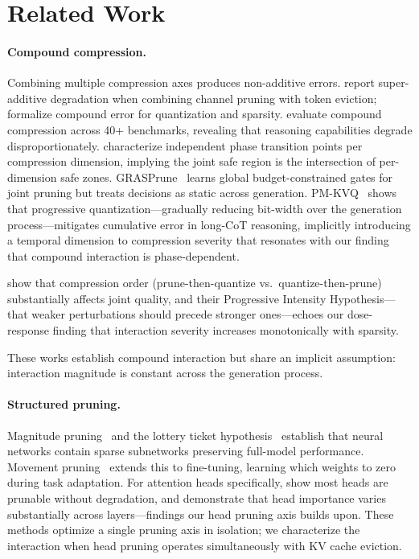 \section{Related Work}
\label{sec:related}

\paragraph{Compound compression.}
Combining multiple compression axes produces non-additive errors.
\cite{spark-aaai2026} report super-additive degradation when combining channel pruning with token eviction; \cite{slim-icml2025} formalize compound error for quantization and sparsity.
\cite{unicomp-2026} evaluate compound compression across 40+ benchmarks, revealing that reasoning capabilities degrade disproportionately.
\cite{phase-transition-compression-2026} characterize independent phase transition points per compression dimension, implying the joint safe region is the intersection of per-dimension safe zones.
GRASPrune~\cite{graspune-acl2026} learns global budget-constrained gates for joint pruning but treats decisions as static across generation.
PM-KVQ~\cite{pmkvq-iclr2026} shows that progressive quantization---gradually reducing bit-width over the generation process---mitigates cumulative error in long-CoT reasoning, implicitly introducing a temporal dimension to compression severity that resonates with our finding that compound interaction is phase-dependent.

\cite{kim2026pqqp} show that compression order (prune-then-quantize vs.\ quantize-then-prune) substantially affects joint quality, and their Progressive Intensity Hypothesis---that weaker perturbations should precede stronger ones---echoes our dose-response finding that interaction severity increases monotonically with sparsity.

These works establish compound interaction but share an implicit assumption: interaction magnitude is constant across the generation process.

\paragraph{Structured pruning.}
Magnitude pruning~\cite{han-neurips2015} and the lottery ticket hypothesis~\cite{frankle-iclr2019} establish that neural networks contain sparse subnetworks preserving full-model performance.
Movement pruning~\cite{sanh-neurips2020} extends this to fine-tuning, learning which weights to zero during task adaptation.
For attention heads specifically, \cite{voita-acl2019} show most heads are prunable without degradation, and \cite{michel-neurips2019} demonstrate that head importance varies substantially across layers---findings our head pruning axis builds upon. These methods optimize a single pruning axis in isolation; we characterize the interaction when head pruning operates simultaneously with KV cache eviction.

